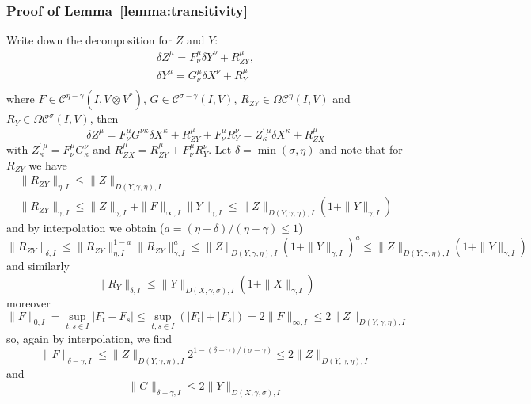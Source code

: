 \documentclass[a4paper,12pt,reqno]{amsproc}
\newcommand{\der}{\delta\!}
\newcommand{\CC}{\mathcal{C}}
\newcommand{\OCC}{\Omega \mathcal{C}}
\begin{document}
\subsubsection{Proof of Lemma~\ref{lemma:transitivity}}
\label{sec:proof-transitivity}
\proof
Write down the decomposition for $Z$ and $Y$:
\begin{equation*}
  \begin{gathered}
  \der Z^\mu = F^{\mu}_{\nu} \der Y^\nu + R^\mu_{ZY},\\
  \der Y^\mu = G^{\mu}_{\nu} \der X^\nu + R^\mu_Y\\
  \end{gathered}
\end{equation*}
where $F \in \CC^{\eta-\gamma}(I,V \otimes V^*)$, $G \in \CC^{\sigma-\gamma}(I,V)$, $R_{ZY} \in
\OCC^\eta(I,V)$ and $R_Y \in \OCC^\sigma(I,V)$, then
\begin{equation*}
  \der Z^\mu = F^{\mu}_{\nu} G^{\nu\kappa} \der X^\kappa + R^\mu_{ZY} + F^{\mu}_{\nu} R^\nu_Y = Z^{\prime\,\mu}_{\kappa} \der X^\kappa + R^\mu_{ZX}
\end{equation*}
with $Z^{\prime\,\mu}_{\kappa} = F^{\mu}_{\nu} G^{\nu}_{\kappa}$ and $R^\mu_{ZX} = R^\mu_{ZY} + F^{\mu}_{\nu} R^\nu_{Y}$.
Let $\delta = \min(\sigma,\eta)$ and
note that for $R_{ZY}$ we have
\begin{equation*}
  \begin{gathered}
\|R_{ZY}\|_{\eta,I} \le \|Z\|_{D(Y,\gamma,\eta),I}\\
\|R_{ZY}\|_{\gamma,I} \le \|Z\|_{\gamma,I} + \|F\|_{\infty,I} \|Y\|_{\gamma,I} \le
\|Z\|_{D(Y,\gamma,\eta),I} (1+\|Y\|_{\gamma,I})    
  \end{gathered}
\end{equation*}
and by interpolation we obtain ($a=(\eta-\delta)/(\eta-\gamma) \le 1$)
$$
\|R_{ZY}\|_{\delta,I} \le \|R_{ZY}\|_{\eta,I}^{1-a} \|R_{ZY}\|_{\gamma,I}^{a}  \le \|Z\|_{D(Y,\gamma,\eta),I} (1+\|Y\|_{\gamma,I})^a 
\le \|Z\|_{D(Y,\gamma,\eta),I} (1+\|Y\|_{\gamma,I}) 
$$
and similarly
$$
\|R_{Y}\|_{\delta,I} \le \|Y\|_{D(X,\gamma,\sigma),I} (1+\|X\|_{\gamma,I})
$$
moreover
$$
\|F\|_{0,I} = \sup_{t,s \in I}|F_t-F_s| \le \sup_{t,s \in I} (|F_t|+ |F_s|) = 2
\|F\|_{\infty,I}  \le 2 \|Z\|_{D(Y,\gamma,\eta),I} 
$$
so, again by interpolation, we find
$$
\|F\|_{\delta-\gamma,I} \le \|Z\|_{D(Y,\gamma,\eta),I}
2^{1-(\delta-\gamma)/(\sigma-\gamma)} \le 2  \|Z\|_{D(Y,\gamma,\eta),I}
$$
and
$$
\|G\|_{\delta-\gamma,I} \le 2  \|Y\|_{D(X,\gamma,\sigma),I}
$$
\end{document}
